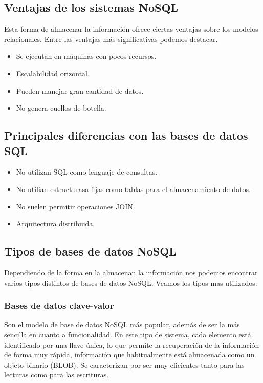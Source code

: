 \documentclass[12pts, A3 ,twosides]{article}
\begin{document}
\subsection{Ventajas de los sistemas NoSQL}
Esta forma de almacenar la información ofrece ciertas ventajas sobre los modelos relacionales. Entre las ventajas más significativas podemos destacar.
\begin{itemize}
\item Se ejecutan en máquinas con pocos recursos.
\item Escalabilidad orizontal.
\item Pueden manejar gran cantidad de datos.
\item No genera cuellos de botella.
\end{itemize}

\subsection{Principales diferencias con las bases de datos SQL}
\begin{itemize}
\item No utilizan SQL como lenguaje de consultas.
\item No utilian estructurasa fijas como tablas para el almacenamiento de datos.
\item No suelen permitir operaciones JOIN.
\item Arquitectura distribuida.
\end{itemize}



\subsection{Tipos de bases de datos NoSQL}
Dependiendo de la forma en la almacenan la información nos podemos encontrar varios tipos distintos de bases de datos NoSQL. Veamos los tipos mas utilizados.
\subsubsection{Bases de datos clave-valor}
Son  el  modelo  de  base  de  datos  NoSQL  más  popular,  además  de  ser  la  más  sencilla  en  cuanto  a funcionalidad. En este tipo de sistema, cada elemento está identificado por una llave única, lo que permite la recuperación de  la información de  forma muy rápida, información que  habitualmente  está almacenada como un objeto binario (BLOB). Se caracterizan por ser muy eficientes tanto para las lecturas como para las escrituras. 
\end{document}
